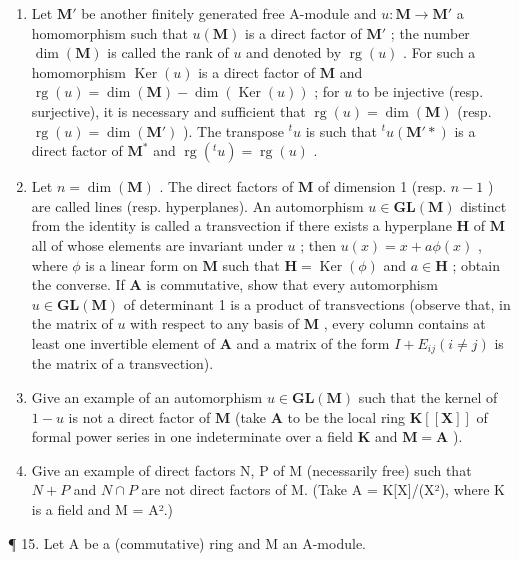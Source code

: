 \begin{enumerate}
\def\labelenumi{(\alph{enumi})}
\item
  Let \(\mathbf{M}'\) be another finitely generated free A-module and \(u: \mathbf{M} \to \mathbf{M}'\) a homomorphism such that \(u(\mathbf{M})\) is a direct factor of \(\mathbf{M}'\) ; the number \(\dim(\mathbf{M})\) is called the rank of \(u\) and denoted by \(\operatorname{rg}(u)\) . For such a homomorphism \(\operatorname{Ker}(u)\) is a direct factor of \(\mathbf{M}\) and \(\operatorname{rg}(u) = \dim(\mathbf{M}) - \dim(\operatorname{Ker}(u))\) ; for \(u\) to be injective (resp. surjective), it is necessary and sufficient that \(\operatorname{rg}(u) = \dim(\mathbf{M})\) (resp. \(\operatorname{rg}(u) = \dim(\mathbf{M}')\) ). The transpose \(^t u\) is such that \(^t u(\mathbf{M}'*)\) is a direct factor of \(\mathbf{M}^*\) and \(\operatorname{rg}(^t u) = \operatorname{rg}(u)\) .
\item
  Let \(n = \dim(\mathbf{M})\) . The direct factors of \(\mathbf{M}\) of dimension 1 (resp. \(n - 1\) ) are called lines (resp. hyperplanes). An automorphism \(u \in \mathbf{GL}(\mathbf{M})\) distinct from the identity is called a transvection if there exists a hyperplane \(\mathbf{H}\) of \(\mathbf{M}\) all of whose elements are invariant under \(u\) ; then \(u(x) = x + a\phi(x)\) , where \(\phi\) is a linear form on \(\mathbf{M}\) such that \(\mathbf{H} = \operatorname{Ker}(\phi)\) and \(a \in \mathbf{H}\) ; obtain the converse. If \(\mathbf{A}\) is commutative, show that every automorphism \(u \in \mathbf{GL}(\mathbf{M})\) of determinant 1 is a product of transvections (observe that, in the matrix of \(u\) with respect to any basis of \(\mathbf{M}\) , every column contains at least one invertible element of \(\mathbf{A}\) and a matrix of the form \(I + E_{ij} (i \neq j)\) is the matrix of a transvection).
\item
  Give an example of an automorphism \(u \in \mathbf{GL}(\mathbf{M})\) such that the kernel of \(1 - u\) is not a direct factor of \(\mathbf{M}\) (take \(\mathbf{A}\) to be the local ring \(\mathbf{K}[[\mathbf{X}]]\) of formal power series in one indeterminate over a field \(\mathbf{K}\) and \(\mathbf{M} = \mathbf{A}\) ).
\item
  Give an example of direct factors N, P of M (necessarily free) such that \(N + P\) and \(N \cap P\) are not direct factors of M. (Take A = K{[}X{]}/(X²), where K is a field and M = A².)
\end{enumerate}

¶ 15. Let A be a (commutative) ring and M an A-module.

